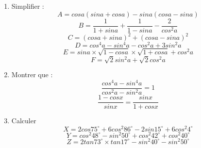 \documentclass[a4paper,12pt]{article}
\begin{document}
\begin{exo}
\begin{enumerate}
\item Simplifier :
$$A=cos a(sin a + cos a )-sin a(cos a -sin a) $$
$$B=\dfrac{1}{1+sin a}+\dfrac{1}{1-sin a}-\dfrac{2}{cos^{2}a} $$
$$C=(cosa + sina)^{2}+(cosa-sina)^{2} $$
$$D=cos^{4}a-sin^{4}a-cos^{2}a+3sin^{2}a$$
$$E=sina\times \sqrt{1-cosa}\times \sqrt{1+cosa}+cos^{2}a$$
$$F=\sqrt{2}sin^{2}a+\sqrt{2}cos^{2}a$$
\item Montrer que :
$$\dfrac{cos^{4}a-sin^{4}a}{cos^{2}a-sin^{2}a}=1$$
$$\dfrac{1-cosx}{sinx}=\dfrac{sinx}{1+cosx}$$
\item Calculer 
$$ X= 2cos75^{\circ}+6cos^{2}86^{\circ}-2sin15^{\circ}+6cos^{2}4^{\circ}$$
$$ Y=cos^{2}48^{\circ}-sin^{2}50^{\circ}+cos^{2}42^{\circ}+cos^{2}40^{\circ}$$
$$ Z=2tan73^{\circ}\times tan17^{\circ}-sin^{2}40^{\circ}-sin^{2}50^{\circ}$$
\end{enumerate}
\end{exo}
\end{document}
